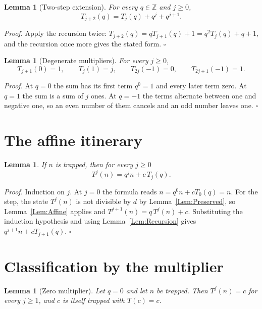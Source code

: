 \documentclass[11pt,letterpaper]{article}
\newcommand{\Z}{\mathbb{Z}}
\newtheorem{lemma}[theorem]{Lemma}
\newenvironment{proof}{\noindent\textit{Proof.}}{\hfill\(\square\)}
\begin{document}
\begin{lemma}[Two-step extension]\label{Lem:Extension}
For every \(q\in\Z\) and \(j\ge0\),
\[
T_{j+2}(q)=T_{j}(q)+q^{j}+q^{j+1}.
\]
\end{lemma}

\begin{proof}
Apply the recursion twice: \(T_{j+2}(q)=qT_{j+1}(q)+1=q^{2}T_{j}(q)+q+1\), and
the recursion once more gives the stated form.
\end{proof}

\begin{lemma}[Degenerate multipliers]\label{Lem:Degenerate}
For every \(j\ge0\),
\[
T_{j+1}(0)=1,\qquad T_{j}(1)=j,\qquad T_{2j}(-1)=0,\qquad
T_{2j+1}(-1)=1 .
\]
\end{lemma}

\begin{proof}
At \(q=0\) the sum has its first term \(q^{0}=1\) and every later term zero. At
\(q=1\) the sum is a sum of \(j\) ones. At \(q=-1\) the terms alternate between
one and negative one, so an even number of them cancels and an odd number
leaves one.
\end{proof}

\section{The affine itinerary}

\begin{lemma}\label{Lem:Itinerary}
If \(n\) is trapped, then for every \(j\ge0\)
\[
T^{j}(n)=q^{j}n+c\,T_{j}(q).
\]
\end{lemma}

\begin{proof}
Induction on \(j\). At \(j=0\) the formula reads \(n=q^{0}n+cT_{0}(q)=n\). For
the step, the state \(T^{j}(n)\) is not divisible by \(d\) by
Lemma~\ref{Lem:Preserved}, so Lemma~\ref{Lem:Affine} applies and
\(T^{j+1}(n)=q\,T^{j}(n)+c\). Substituting the induction hypothesis and using
Lemma~\ref{Lem:Recursion} gives \(q^{j+1}n+cT_{j+1}(q)\).
\end{proof}

\section{Classification by the multiplier}

\begin{lemma}[Zero multiplier]\label{Lem:ZeroConstant}
Let \(q=0\) and let \(n\) be trapped. Then \(T^{j}(n)=c\) for every \(j\ge1\),
and \(c\) is itself trapped with \(T(c)=c\).
\end{lemma}
\end{document}
